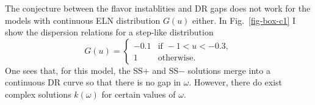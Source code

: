 The conjecture between the flavor instablities and DR gaps does not work for the models with continuous ELN distribution $G(u)$ either. In Fig.~\ref{fig-box-c1} I show the dispersion relations for a step-like distribution
\begin{equation}
G(u) = \begin{cases}
-0.1 &  \text{if } -1 < u < -0.3, \\
1 &  \text{otherwise.}
\end{cases}
\label{chap:collective-sec:gap-eqn:eln-step-like}
\end{equation}
One sees that, for this model, the SS$+$ and SS$-$ solutions merge into a continuous DR curve so that there is no gap in $\omega$. However, there do exist complex solutions $k(\omega)$ for certain values of $\omega$.


%



